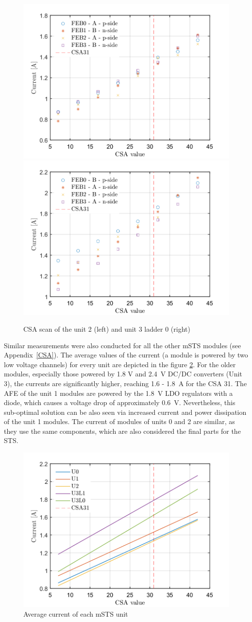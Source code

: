 \begin{figure}[h!]
\centering
\includegraphics[width=0.45\columnwidth]{Chapter5/DCS/images/U2CSABIAS.png}
\includegraphics[width=0.45\columnwidth]{Chapter5/DCS/images/U3L1CSABIAS.png}
\caption{CSA scan of the unit 2 (left) and unit 3 ladder 0 (right)}
\label{fig_power2}
\end{figure}
\newpage
Similar measurements were also conducted for all the other \gls{mSTS} modules (see Appendix~\ref{CSA}). The average values of the current (a module is powered by two low voltage channels) for every unit are depicted in the figure \ref{fig_avg}. For the older modules, especially those powered by 1.8 V and 2.4~V DC/DC converters (Unit 3), the currents are significantly higher, reaching 1.6 - 1.8~A for the \gls{CSA} 31. The \gls{AFE} of the unit 1 modules are powered by the 1.8~V \gls{LDO} regulators with a diode, which causes a voltage drop of approximately 0.6~V. Nevertheless, this sub-optimal solution can be also seen via increased current and power dissipation of the unit 1 modules. The current of modules of units 0 and 2 are similar, as they use the same components, which are also considered the final parts for the \gls{STS}.

\begin{figure}[h!]
\centering
\includegraphics[width=0.6\columnwidth]{Chapter5/DCS/images/units.png}
\caption{Average current of each \gls{mSTS} unit}
\label{fig_avg}
\end{figure}

